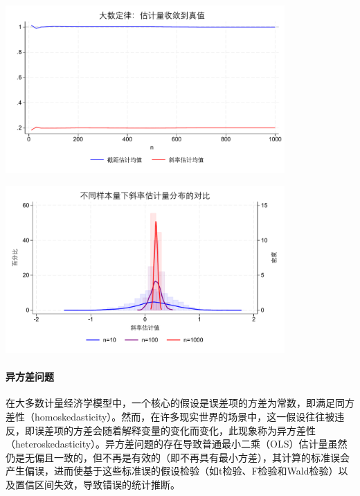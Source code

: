 \begin{tcolorbox}[title=在 Stata 中运用模拟法验证大样本假定, colback=white, colframe=black, colbacktitle=white, coltitle=black,fonttitle=\bfseries]

	\begin{center}
	\includegraphics[width=0.8\textwidth]{image/large_numbers.pdf}
	\end{center}
	\begin{center}
	\includegraphics[width=0.8\textwidth]{image/central_limit.pdf}
	\end{center}
\end{tcolorbox}

\paragraph*{异方差问题}

在大多数计量经济学模型中，一个核心的假设是误差项的方差为常数，即满足同方差性（homoskedasticity）。然而，在许多现实世界的场景中，这一假设往往被违反，即误差项的方差会随着解释变量的变化而变化，此现象称为异方差性（heteroskedasticity）。异方差问题的存在导致普通最小二乘（OLS）估计量虽然仍是无偏且一致的，但不再是有效的（即不再具有最小方差），其计算的标准误会产生偏误，进而使基于这些标准误的假设检验（如t检验、F检验和Wald检验）以及置信区间失效，导致错误的统计推断。

